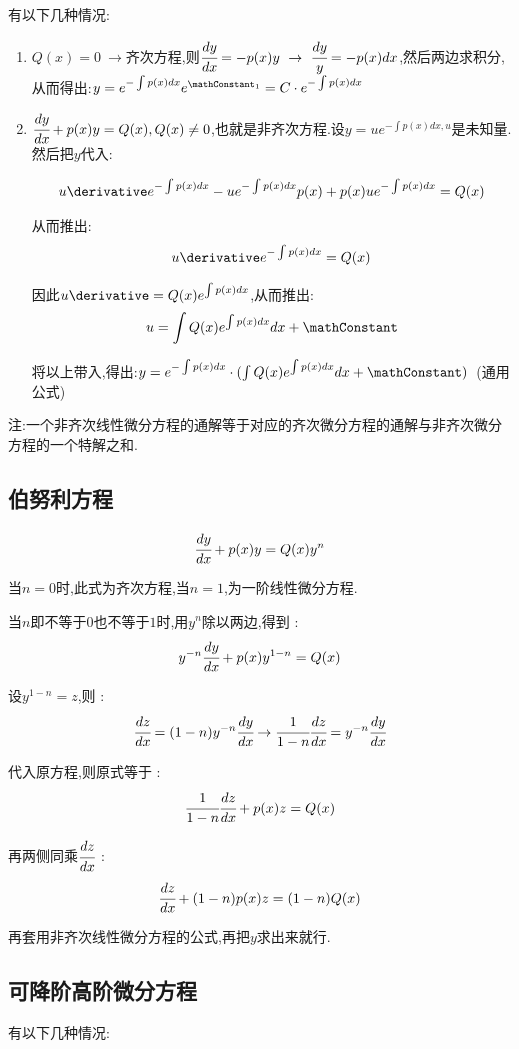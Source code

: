 {{{  有以下几种情况:
  \begin{enumerate}
    \item $Q(x) = 0\ \to$齐次方程,则$\cfrac{dy}{dx} = -p(x)y\ \to \ \cfrac{dy}{y} = -p(x)dx$,然后两边求积分,从而得出:$y = e^{-\int p(x)dx}e^{\mathConstant_1} = C \cdot e^{-\int p(x)dx}$
    \item {
          $\cfrac{dy}{dx} + p(x)y = Q(x), Q(x) \neq 0$,也就是非齐次方程.设$y = ue^{-\int p(x)dx, u}$是未知量.然后把$y$代入:

          $$
            u\derivative e^{-\int p(x)dx} - ue^{-\int p(x)dx}p(x) + p(x)ue^{-\int p(x)dx} = Q(x)
          $$

          从而推出:
          $$
            u\derivative e^{-\int p(x)dx} = Q(x)
          $$

          因此$u\derivative = Q(x)e^{\int p(x)dx}$,从而推出:
          $$
            u = \int Q(x)e^{\int p(x)dx}dx + \mathConstant
          $$

          将以上带入,得出:$y = e^{-\int p(x)dx}\cdot(\int Q(x)e^{\int p(x)dx}dx + \mathConstant)$\ (通用公式)
          }
  \end{enumerate}

  注:一个非齐次线性微分方程的通解等于对应的齐次微分方程的通解与非齐次微分方程的一个特解之和.

}%

\subsection{伯努利方程}{
  $$
    \cfrac{dy}{dx} + p(x)y = Q(x)y^n
  $$

  当$n = 0$时,此式为齐次方程,当$n = 1$,为一阶线性微分方程.

  当$n$即不等于$0$也不等于$1$时,用$y^n$除以两边,得到 :
  $$
    y^{-n}\cfrac{dy}{dx} + p(x)y^{1 - n} = Q(x)
  $$

  设$y^{1 - n} = z$,则 :
  $$
    \cfrac{dz}{dx} = (1 - n)y^{-n}\cfrac{dy}{dx} \to \cfrac{1}{1 - n}\cfrac{dz}{dx} = y^{-n}\cfrac{dy}{dx}
  $$

  代入原方程,则原式等于 :
  $$
    \cfrac{1}{1 - n}\cfrac{dz}{dx} + p(x)z = Q(x)
  $$

  再两侧同乘$\cfrac{dz}{dx}$ :
  $$
    \cfrac{dz}{dx} + (1 - n)p(x)z = (1 - n)Q(x)
  $$

  再套用非齐次线性微分方程的公式,再把$y$求出来就行.
}%

\subsection{可降阶高阶微分方程}{
  有以下几种情况:

}}}
